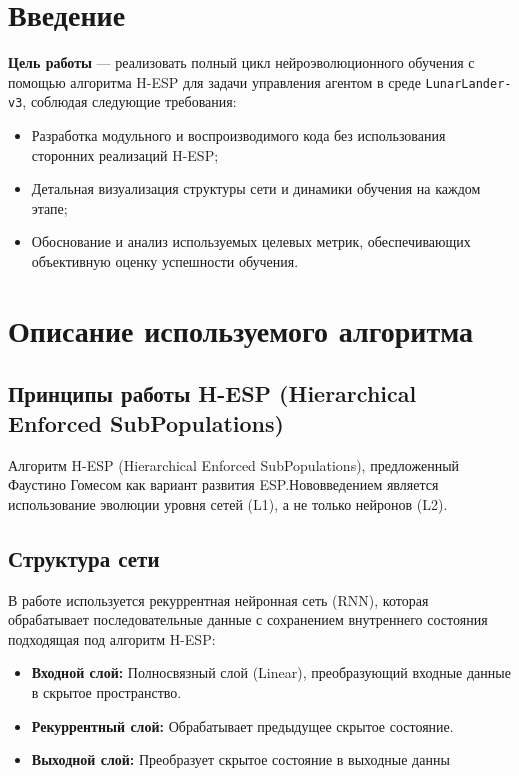 \documentclass[a4paper,12pt]{article}
\begin{document}
\tableofcontents
\setcounter{page}{2}
\newpage

\titleformat{\section}{\normalfont\bfseries}{\thesection}{1em}{}
\titleformat{\subsection}{\normalfont\bfseries}{\thesubsection}{1em}{}
\setlength{\parindent}{15mm}
\onehalfspacing

\section{Введение}

\textbf{Цель работы} — реализовать полный цикл нейроэволюционного обучения с помощью алгоритма H-ESP для задачи управления агентом в среде \texttt{LunarLander-v3}, соблюдая следующие требования:
\begin{itemize}
	\item Разработка модульного и воспроизводимого кода без использования сторонних реализаций H-ESP;
	\item Детальная визуализация структуры сети и динамики обучения на каждом этапе;
	\item Обоснование и анализ используемых целевых метрик, обеспечивающих объективную оценку успешности обучения.
\end{itemize}

\newpage
\section{Описание используемого алгоритма}

\subsection{Принципы работы H-ESP (Hierarchical Enforced SubPopulations)}
Алгоритм H-ESP (Hierarchical Enforced SubPopulations), предложенный Фаустино Гомесом как вариант развития ESP.Нововведением является использование эволюции уровня сетей (L1), а не только нейронов (L2).


\subsection{Структура сети}
В работе используется рекуррентная нейронная сеть (RNN), которая обрабатывает последовательные данные с сохранением внутреннего состояния подходящая под алгоритм H-ESP:
\begin{itemize}
	\item \textbf{Входной слой:} Полносвязный слой (Linear), преобразующий входные данные в скрытое пространство.
	\item \textbf{Рекуррентный слой:} Обрабатывает предыдущее скрытое состояние.
	\item \textbf{Выходной слой:} Преобразует скрытое состояние в выходные данны
\end{itemize}
\end{document}
